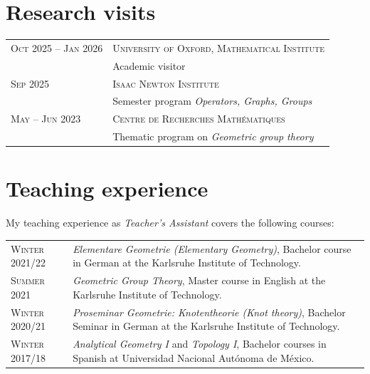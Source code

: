 \documentclass[a4paper,10pt]{article} %
\begin{document}
\section{Research visits}

\begin{longtable}{>{\raggedleft\arraybackslash}p{4.2cm}p{11cm}}

\textsc{Oct 2025 -- Jan 2026} &\textsc{University of Oxford, Mathematical Institute} \\ & Academic visitor\vspace{0.5em}\\

\textsc{Sep 2025} &\textsc{Isaac Newton Institute} \\ &Semester program \emph{Operators, Graphs, Groups} \vspace{0.5em}\\

\textsc{May -- Jun 2023} &\textsc{Centre de Recherches Mathématiques} \\ & Thematic program on \emph{Geometric group theory}

\end{longtable}


\section{Teaching experience}

\begin{minipage}{15cm}
My teaching experience as \emph{Teacher's Assistant} covers the following courses:\end{minipage}

\begin{longtable}{>{\raggedleft\arraybackslash}p{4.2cm}p{11cm}}

    \textsc{Winter 2021/22} & \emph{Elementare Geometrie (Elementary Geometry)}, Bachelor course in German at the Karlsruhe Institute of Technology. \\

    \textsc{Summer 2021} & \emph{Geometric Group Theory}, Master course in English at the Karlsruhe Institute of Technology.\\

    \textsc{Winter 2020/21} & \emph{Proseminar Geometrie: Knotentheorie (Knot theory)}, Bachelor Seminar in German at the Karlsruhe Institute of Technology.\\

    \textsc{Winter 2017/18} & \emph{Analytical Geometry I} and \emph{Topology I}, Bachelor courses in Spanish at Universidad Nacional Autónoma de México.\\
    
\end{longtable}
\end{document}
